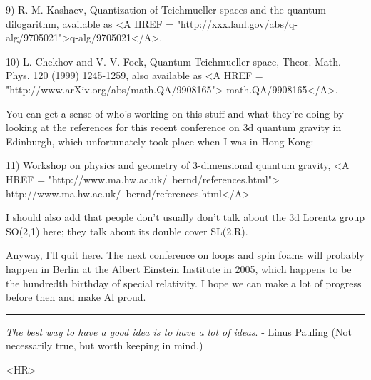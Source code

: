 9) R. M. Kashaev, Quantization of Teichmueller spaces and the quantum 
dilogarithm, available as <A HREF = "http://xxx.lanl.gov/abs/q-alg/9705021">q-alg/9705021</A>.

10) L. Chekhov and V. V. Fock, Quantum Teichmueller space, 
Theor. Math. Phys. 120 (1999) 1245-1259, also available as 
<A HREF = "http://www.arXiv.org/abs/math.QA/9908165">
math.QA/9908165</A>.

You can get a sense of who's working on this stuff and what they're
doing by looking at the references for this recent conference on 3d 
quantum gravity in Edinburgh, which unfortunately took place when I 
was in Hong Kong:

11) Workshop on physics and geometry of 3-dimensional quantum gravity,
<A HREF = "http://www.ma.hw.ac.uk/~bernd/references.html">
http://www.ma.hw.ac.uk/~bernd/references.html</A>

I should also add that people don't usually don't talk about the 3d 
Lorentz group SO(2,1) here; they talk about its double cover SL(2,R).

Anyway, I'll quit here.  The next conference on loops and spin foams
will probably happen in Berlin at the Albert Einstein Institute in 
2005, which happens to be the hundredth birthday of special relativity.
I hope we can make a lot of progress before then and make Al proud.

\par\noindent\rule{\textwidth}{0.4pt}
\emph{The best way to have a good idea is to have a lot of ideas}. -
Linus Pauling
(Not necessarily true, but worth keeping in mind.)

<HR>



